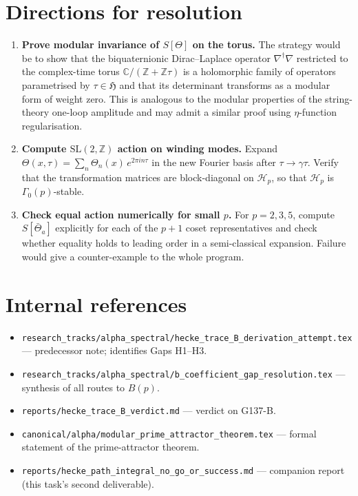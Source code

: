 \documentclass[12pt,a4paper]{article}
\theoremstyle{definition}
\theoremstyle{remark}
\newcommand{\SL}{\mathrm{SL}}
\newcommand{\bH}{\mathfrak{H}}     %
\newcommand{\CC}{\mathbb{C}}
\newcommand{\ZZ}{\mathbb{Z}}
\newcommand{\Gam}{\Gamma}
\newcommand{\Hp}{\mathcal{H}_p}
\begin{document}
\section{Directions for resolution}
\label{sec:resolution}

\begin{enumerate}

\item \textbf{Prove modular invariance of $S[\Theta]$ on the torus.}
  The strategy would be to show that the biquaternionic Dirac--Laplace
  operator $\nabla^\dagger\nabla$ restricted to the complex-time torus
  $\CC/(\ZZ+\ZZ\tau)$ is a holomorphic family of operators parametrised by
  $\tau\in\bH$ and that its determinant transforms as a modular form of
  weight zero.  This is analogous to the modular properties of the
  string-theory one-loop amplitude and may admit a similar proof using
  $\eta$-function regularisation.

\item \textbf{Compute $\SL(2,\ZZ)$ action on winding modes.}
  Expand $\Theta(x,\tau)=\sum_n\Theta_n(x)\,e^{2\pi in\tau}$ in the new
  Fourier basis after $\tau\to\gamma\tau$.  Verify that the transformation
  matrices are block-diagonal on $\Hp$, so that $\Hp$ is $\Gam_0(p)$-stable.

\item \textbf{Check equal action numerically for small $p$.}
  For $p=2,3,5$, compute $S[\bar\Theta_a]$ explicitly for each of the
  $p+1$ coset representatives and check whether equality holds to leading
  order in a semi-classical expansion.  Failure would give a
  counter-example to the whole program.

\end{enumerate}

\section*{Internal references}

\begin{itemize}
  \item \texttt{research\_tracks/alpha\_spectral/hecke\_trace\_B\_derivation\_attempt.tex}
        — predecessor note; identifies Gaps H1--H3.
  \item \texttt{research\_tracks/alpha\_spectral/b\_coefficient\_gap\_resolution.tex}
        — synthesis of all routes to $B(p)$.
  \item \texttt{reports/hecke\_trace\_B\_verdict.md} — verdict on G137-B.
  \item \texttt{canonical/alpha/modular\_prime\_attractor\_theorem.tex}
        — formal statement of the prime-attractor theorem.
  \item \texttt{reports/hecke\_path\_integral\_no\_go\_or\_success.md}
        — companion report (this task's second deliverable).
\end{itemize}
\end{document}
